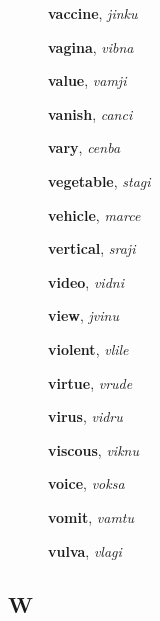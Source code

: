 \documentclass[12pt]{book}
\begin{document}
\begin{description}

\item[ ] \textbf{vaccine}, \textit{jinku}

\item[ ] \textbf{vagina}, \textit{vibna}

\item[ ] \textbf{value}, \textit{vamji}

\item[ ] \textbf{vanish}, \textit{canci}

\item[ ] \textbf{vary}, \textit{cenba}

\item[ ] \textbf{vegetable}, \textit{stagi}

\item[ ] \textbf{vehicle}, \textit{marce}

\item[ ] \textbf{vertical}, \textit{sraji}

\item[ ] \textbf{video}, \textit{vidni}

\item[ ] \textbf{view}, \textit{jvinu}

\item[ ] \textbf{violent}, \textit{vlile}

\item[ ] \textbf{virtue}, \textit{vrude}

\item[ ] \textbf{virus}, \textit{vidru}

\item[ ] \textbf{viscous}, \textit{viknu}

\item[ ] \textbf{voice}, \textit{voksa}

\item[ ] \textbf{vomit}, \textit{vamtu}

\item[ ] \textbf{vulva}, \textit{vlagi}



\end{description}



\subsection{W} %
\end{document}
